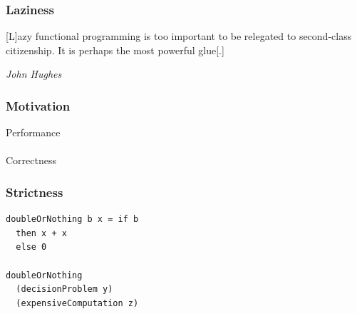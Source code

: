 \documentclass[14pt]{beamer}
\begin{document}
\begin{frame} 
\frametitle{Laziness}
[L]azy functional programming is too important to be relegated to second-class
citizenship. It is perhaps the most powerful glue[.]

\null\hfill \emph{John Hughes}
\end{frame}

\begin{frame}
\frametitle{Motivation}
\large
\begin{center}
Performance 
\\
\null\hfill
\\
Correctness
\end{center}
\end{frame}

\begin{frame}[fragile]
\frametitle{Strictness}
\begin{lstlisting}
doubleOrNothing b x = if b 
  then x + x
  else 0

doubleOrNothing 
  (decisionProblem y) 
  (expensiveComputation z)
\end{lstlisting}
\end{frame}
\end{document}
